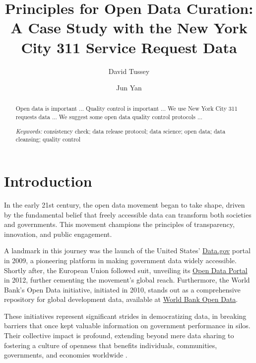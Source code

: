 \documentclass[12pt, titlepage]{article}
\title{Principles for Open Data Curation: A Case Study with the New
  York City 311 Service Request Data}
\author[1]{David Tussey}
\author[2]{Jun Yan}
\affil[1]{Former Executive Director, NYC DoITT}
\affil[2]{Department of Statistics, University of Connecticut}
\begin{document}
\maketitle

\tableofcontents %
\listoffigures %
\listoftables %



\begin{abstract}
  Open data is important ...
  Quality control is important ...
  We use New York City 311 requests data  ...
  We suggest some open data quality control protocols ...


\bigskip
  
\noindent
{\it Keywords:}
consistency check;    
data release protocol;
data science;
open data;
data cleansing;
quality control	
\end{abstract}

\doublespacing

\section{Introduction} \label{sec:intro}

In the early 21st century, the open data movement began to take shape, driven by the 
fundamental belief that freely accessible data can transform 
both societies and governments. This movement champions the principles of 
transparency, innovation, and public engagement. 

A landmark in this journey was the launch of the United States'
\href{https://www.data.gov}{Data.gov} portal in 2009, a pioneering
platform in making government data widely accessible. Shortly after,
the European Union followed suit, unveiling its
\href{https://data.europa.eu/euodp}{Open Data Portal} in 2012, further
cementing the movement's global reach. Furthermore, the World Bank's Open
Data initiative, initiated in 2010, stands out as a comprehensive
repository for global development data, available at
\href{https://data.worldbank.org}{World Bank Open Data}. 

These initiatives represent significant strides in democratizing data, in breaking barriers that once
kept valuable information on government performance in silos. Their collective impact is profound, extending beyond
mere data sharing to fostering a culture of openness that benefits
individuals, communities, governments, and economies worldwide
\citep{barns2016mine, wang2016adoption}.
\end{document}
